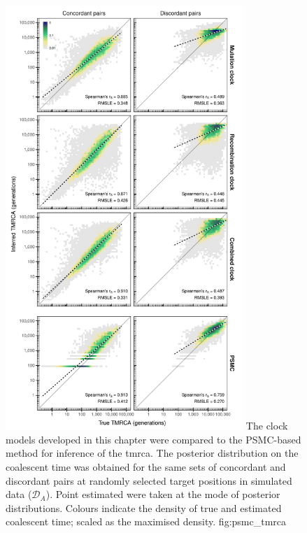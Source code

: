 

\begin{figure}[p]
\centering
\vspace*{-15pt}
\includegraphics[width=0.8\textwidth]{./img/ch5/psmc_tmrca}
%
{The clock models developed in this chapter were compared to the PSMC-based method for inference of the \gls{tmrca}.
The posterior distribution on the coalescent time was obtained for the same sets of concordant and discordant pairs at  randomly selected target positions in simulated data ($\mathcal{D}_A$).
Point estimated were taken at the mode of posterior distributions.
Colours indicate the density of true and estimated coalescent time; scaled as the maximised density.}%
{fig:psmc_tmrca}
\end{figure}
